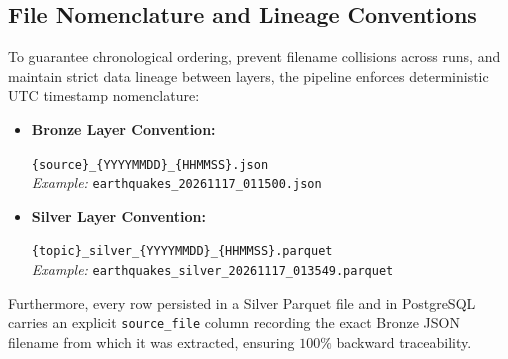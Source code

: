 \subsection{File Nomenclature and Lineage Conventions}
To guarantee chronological ordering, prevent filename collisions across runs, and maintain strict data lineage between layers, the pipeline enforces deterministic UTC timestamp nomenclature:
\begin{itemize}
    \item \textbf{Bronze Layer Convention:}
    \begin{center}
    \texttt{\{source\}\_\{YYYYMMDD\}\_\{HHMMSS\}.json}\\
    \textit{Example:} \texttt{earthquakes\_20261117\_011500.json}
    \end{center}
    \item \textbf{Silver Layer Convention:}
    \begin{center}
    \texttt{\{topic\}\_silver\_\{YYYYMMDD\}\_\{HHMMSS\}.parquet}\\
    \textit{Example:} \texttt{earthquakes\_silver\_20261117\_013549.parquet}
    \end{center}
\end{itemize}
Furthermore, every row persisted in a Silver Parquet file and in PostgreSQL carries an explicit \texttt{source\_file} column recording the exact Bronze JSON filename from which it was extracted, ensuring $100\%$ backward traceability.
